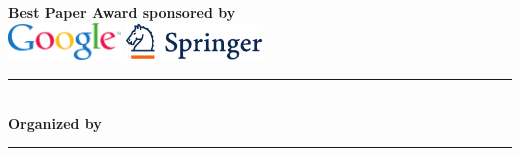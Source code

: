 \begin{center}
\hspace{\separationwidth}
\hspace{\separationwidth}



\vspace{7mm}
\textsf{\textbf{ Best Paper Award sponsored by}}\\
\vspace{3mm}
\includegraphics[height=1cm]{local_img/sponsors/NEW_Glogo_flat_CMYK_Coated}
\hspace{\separationwidth}
\includegraphics[height=1cm]{local_img/sponsors/Springer_cmyk}
\\

\rule{12cm}{1pt}\\[10pt]
\textsf{\textbf{Organized by }}
\hspace{2mm}

\vfill
\rule{12cm}{1pt}\\[10pt]
\end{center}
